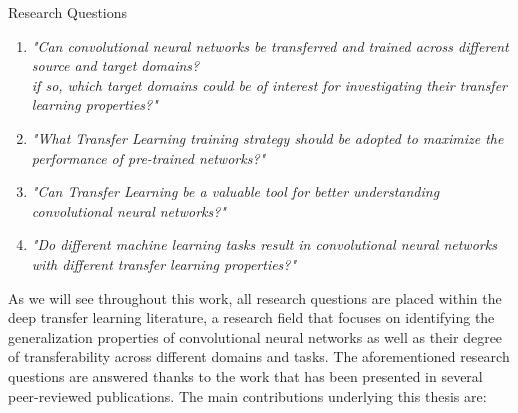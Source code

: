 \begin{remark}{Research Questions}
\begin{enumerate}
	\item \textit{"Can convolutional neural networks be transferred and trained across different source and target domains? \\ if so, which target domains could be of interest for investigating their transfer learning properties?"}
		
	\item \textit{"What Transfer Learning training strategy should be adopted to maximize the performance of pre-trained networks?"}

	\item \textit{"Can Transfer Learning be a valuable tool for better understanding convolutional neural networks?"}
	
	\item \textit{"Do different machine learning tasks result in convolutional neural networks with different transfer learning properties?"}
\end{enumerate}
\end{remark}

As we will see throughout this work, all research questions are placed within the deep transfer learning literature, a research field that focuses on identifying the generalization properties of convolutional neural networks as well as their degree of transferability across different domains and tasks. The aforementioned research questions are answered thanks to the work that has been presented in several peer-reviewed publications. The main contributions underlying this thesis are:

